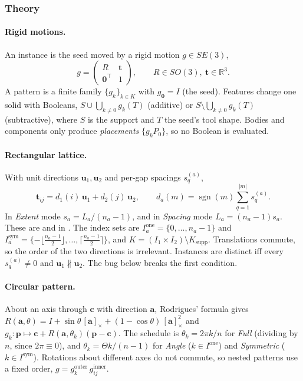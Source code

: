 \subsubsection*{Theory}

\paragraph{Rigid motions.} An instance is the seed moved by a rigid motion $g\in SE(3)$,
\[
  g = \begin{pmatrix} R & \mathbf t\\ \mathbf 0^{\!\top} & 1\end{pmatrix},\qquad
  R\in SO(3),\ \mathbf t\in\mathbb R^3 .
\]
A pattern is a finite family $\{g_k\}_{k\in K}$ with $g_{\mathbf 0}=I$ (the seed). Features change one solid
with Booleans, $S\cup\bigcup_{k\neq 0} g_k(T)$ (additive) or $S\setminus\bigcup_{k\neq0} g_k(T)$
(subtractive), where $S$ is the support and $T$ the seed's tool shape. Bodies and components only produce
\emph{placements} $\{g_k P_0\}$, so no Boolean is evaluated.

\paragraph{Rectangular lattice.} With unit directions $\mathbf u_1,\mathbf u_2$ and per-gap spacings
$s^{(a)}_q$,
\[
  \mathbf t_{ij} = d_1(i)\,\mathbf u_1 + d_2(j)\,\mathbf u_2,\qquad
  d_a(m) = \operatorname{sgn}(m)\sum_{q=1}^{|m|} s^{(a)}_q .
\]
In \emph{Extent} mode $s_a = L_a/(n_a-1)$, and in \emph{Spacing} mode $L_a=(n_a-1)s_a$. These are
 and  in . The index sets are
$I_a^{\text{one}}=\{0,\dots,n_a-1\}$ and $I_a^{\text{sym}}=\{-\lfloor\tfrac{n_a-1}{2}\rfloor,\dots,\lceil\tfrac{n_a-1}{2}\rceil\}$,
and $K=(I_1\times I_2)\setminus K_{\text{supp}}$. Translations commute, so the order of the two directions is
irrelevant. Instances are distinct iff every $s^{(a)}_q\neq0$ and $\mathbf u_1\nparallel\mathbf u_2$. The
bug below breaks the first condition.

\paragraph{Circular pattern.} About an axis through $\mathbf c$ with direction $\mathbf a$, Rodrigues'
formula gives
$R(\mathbf a,\theta) = I + \sin\theta\,[\mathbf a]_\times + (1-\cos\theta)\,[\mathbf a]_\times^2$ and
$g_k:\mathbf p\mapsto\mathbf c+R(\mathbf a,\theta_k)(\mathbf p-\mathbf c)$. The schedule is
$\theta_k = 2\pi k/n$ for \emph{Full} (dividing by $n$, since $2\pi\equiv0$), and
$\theta_k=\Theta k/(n-1)$ for \emph{Angle} ($k\in I^{\text{one}}$) and \emph{Symmetric}
($k\in I^{\text{sym}}$). Rotations about different axes do not commute, so nested patterns use a fixed
order, $g=g^{\text{outer}}_k\,g^{\text{inner}}_{ij}$.

